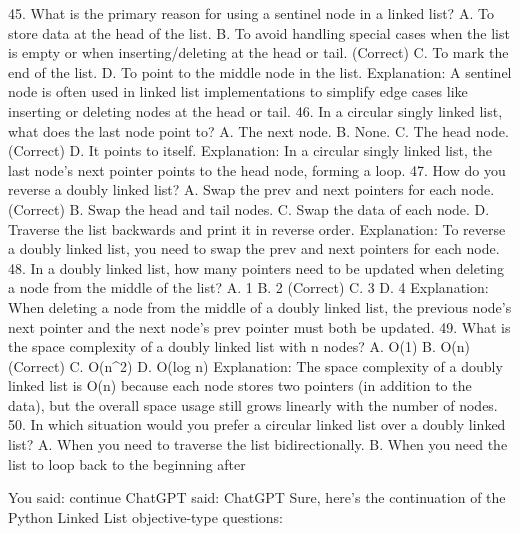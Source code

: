 45. What is the primary reason for using a sentinel node in a linked list?
A. To store data at the head of the list.
B. To avoid handling special cases when the list is empty or when inserting/deleting at the head or tail. (Correct)
C. To mark the end of the list.
D. To point to the middle node in the list.
Explanation: A sentinel node is often used in linked list implementations to simplify edge cases like inserting or deleting nodes at the head or tail.
46. In a circular singly linked list, what does the last node point to?
A. The next node.
B. None.
C. The head node. (Correct)
D. It points to itself.
Explanation: In a circular singly linked list, the last node’s next pointer points to the head node, forming a loop.
47. How do you reverse a doubly linked list?
A. Swap the prev and next pointers for each node. (Correct)
B. Swap the head and tail nodes.
C. Swap the data of each node.
D. Traverse the list backwards and print it in reverse order.
Explanation: To reverse a doubly linked list, you need to swap the prev and next pointers for each node.
48. In a doubly linked list, how many pointers need to be updated when deleting a node from the middle of the list?
A. 1
B. 2 (Correct)
C. 3
D. 4
Explanation: When deleting a node from the middle of a doubly linked list, the previous node’s next pointer and the next node’s prev pointer must both be updated.
49. What is the space complexity of a doubly linked list with n nodes?
A. O(1)
B. O(n) (Correct)
C. O(n^2)
D. O(log n)
Explanation: The space complexity of a doubly linked list is O(n) because each node stores two pointers (in addition to the data), but the overall space usage still grows linearly with the number of nodes.
50. In which situation would you prefer a circular linked list over a doubly linked list?
A. When you need to traverse the list bidirectionally.
B. When you need the list to loop back to the beginning after





You said:
continue
ChatGPT said:
ChatGPT
Sure, here’s the continuation of the Python Linked List objective-type questions:

